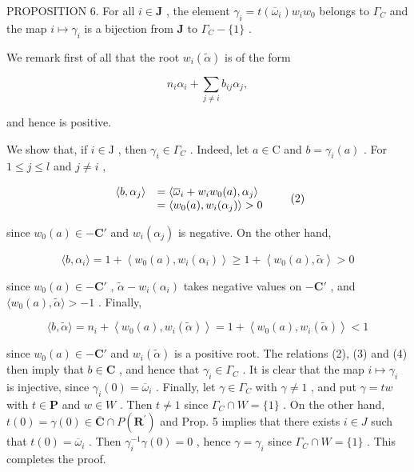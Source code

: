 PROPOSITION 6. For all \(i \in \mathbf{J}\) , the element \(\gamma_i = t(\overline{\omega}_i)w_i w_0\) belongs to \(\Gamma_{C}\) and the map \(i \mapsto \gamma_i\) is a bijection from \(\mathbf{J}\) to \(\Gamma_{C} - \{1\}\) .

We remark first of all that the root \(w_{i}(\tilde{\alpha})\) is of the form

\[
n _ {i} \alpha_ {i} + \sum_ {j \neq i} b _ {i j} \alpha_ {j},
\]

and hence is positive.

We show that, if \(i \in \mathrm{J}\) , then \(\gamma_i \in \Gamma_{C}\) . Indeed, let \(a \in \mathrm{C}\) and \(b = \gamma_i(a)\) . For \(1 \leqslant j \leqslant l\) and \(j \neq i\) ,

\[
\begin{array}{r l} \langle b, \alpha_ {j} \rangle & = \langle \overline {{\omega}} _ {i} + w _ {i} w _ {0} (a), \alpha_ {j} \rangle \\ & = \langle w _ {0} (a), w _ {i} (\alpha_ {j}) \rangle > 0 \end{array}\tag{2}
\]

since \(w_0(a) \in -\mathbf{C}'\) and \(w_i(\alpha_j)\) is negative. On the other hand,

\[
\langle b, \alpha_ {i} \rangle = 1 + \left\langle w _ {0} (a), w _ {i} (\alpha_ {i}) \right\rangle \geqslant 1 + \left\langle w _ {0} (a), \tilde {\alpha} \right\rangle > 0\tag{3}
\]

since \(w_0(a) \in -\mathbf{C}'\) , \(\tilde{\alpha} - w_i(\alpha_i)\) takes negative values on \(-\mathbf{C}'\) , and \(\langle w_0(a), \tilde{\alpha} \rangle > -1\) . Finally,

\[
\langle b, \tilde {\alpha} \rangle = n _ {i} + \left\langle w _ {0} (a), w _ {i} (\tilde {\alpha}) \right\rangle = 1 + \left\langle w _ {0} (a), w _ {i} (\tilde {\alpha}) \right\rangle <   1\tag{4}
\]

since \(w_0(a) \in -\mathbf{C}'\) and \(w_i(\tilde{\alpha})\) is a positive root. The relations (2), (3) and (4) then imply that \(b \in \mathbf{C}\) , and hence that \(\gamma_i \in \Gamma_{C}\) . It is clear that the map \(i \mapsto \gamma_i\) is injective, since \(\gamma_i(0) = \overline{\omega}_i\) . Finally, let \(\gamma \in \Gamma_{C}\) with \(\gamma \neq 1\) , and put \(\gamma = tw\) with \(t \in \mathbf{P}\) and \(w \in W\) . Then \(t \neq 1\) since \(\Gamma_{C} \cap W = \{1\}\) . On the other hand, \(t(0) = \gamma(0) \in \overline{\mathbf{C}} \cap P(\mathbf{R}^{\prime})\) and Prop. 5 implies that there exists \(i \in J\) such that \(t(0) = \overline{\omega}_i\) . Then \(\gamma_i^{-1}\gamma(0) = 0\) , hence \(\gamma = \gamma_i\) since \(\Gamma_{C} \cap W = \{1\}\) . This completes the proof.

